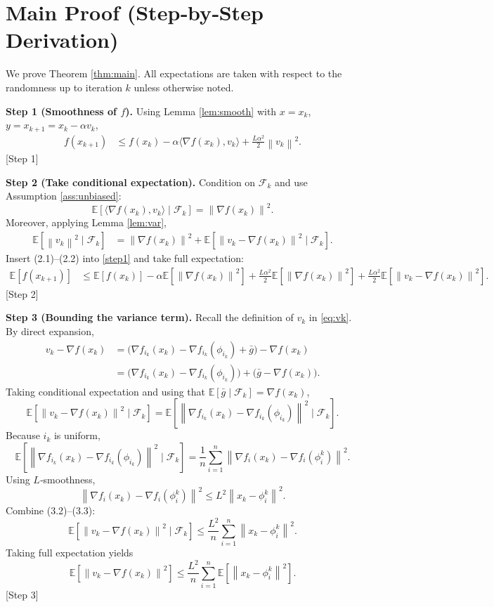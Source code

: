 \documentclass{article}
\newcommand{\E}{\mathbb{E}}
\newcommand{\norm}[1]{\left\|#1\right\|}
\newcommand{\grad}{\nabla}
\begin{document}
\section*{Main Proof (Step‑by‑Step Derivation)}
We prove Theorem \ref{thm:main}. All expectations are taken with respect to the randomness up to iteration $k$ unless otherwise noted.

\bigskip
\noindent\textbf{Step 1 (Smoothness of $f$).}  
Using Lemma \ref{lem:smooth} with $x=x_k$, $y=x_{k+1}=x_k-\alpha v_k$,
\begin{align}
f(x_{k+1}) &\le f(x_k)-\alpha\langle\grad f(x_k),v_k\rangle
             +\frac{L\alpha^{2}}{2}\norm{v_k}^{2}. \label{step1}
\end{align}
[Step 1]

\bigskip
\noindent\textbf{Step 2 (Take conditional expectation).}  
Condition on $\mathcal{F}_k$ and use Assumption \ref{ass:unbiased}:
\[
\E\!\left[\langle\grad f(x_k),v_k\rangle\mid\mathcal{F}_k\right]
   =\norm{\grad f(x_k)}^{2}. \tag{2.1}
\]
Moreover, applying Lemma \ref{lem:var},
\begin{align}
\E\!\left[\norm{v_k}^{2}\mid\mathcal{F}_k\right]
   &=\norm{\grad f(x_k)}^{2}
     +\E\!\left[\norm{v_k-\grad f(x_k)}^{2}\mid\mathcal{F}_k\right]. \tag{2.2}
\end{align}
Insert (2.1)–(2.2) into \eqref{step1} and take full expectation:
\begin{align}
\E\!\left[f(x_{k+1})\right]
 &\le \E\!\left[f(x_k)\right]
    -\alpha\E\!\left[\norm{\grad f(x_k)}^{2}\right]
    +\frac{L\alpha^{2}}{2}\E\!\left[\norm{\grad f(x_k)}^{2}\right]
    +\frac{L\alpha^{2}}{2}\E\!\left[\norm{v_k-\grad f(x_k)}^{2}\right]. \label{step2}
\end{align}
[Step 2]

\bigskip
\noindent\textbf{Step 3 (Bounding the variance term).}  
Recall the definition of $v_k$ in \eqref{eq:vk}. By direct expansion,
\begin{align}
v_k-\grad f(x_k)
   &=\bigl(\grad f_{i_k}(x_k)-\grad f_{i_k}(\phi_{i_k})+\bar g\bigr)-\grad f(x_k) \nonumber\\
   &=\bigl(\grad f_{i_k}(x_k)-\grad f_{i_k}(\phi_{i_k})\bigr)
     +\bigl(\bar g-\grad f(x_k)\bigr). \tag{3.1}
\end{align}
Taking conditional expectation and using that $\E[\bar g\mid\mathcal{F}_k]=\grad f(x_k)$,
\[
\E\!\left[\norm{v_k-\grad f(x_k)}^{2}\mid\mathcal{F}_k\right]
   =\E\!\left[\norm{\grad f_{i_k}(x_k)-\grad f_{i_k}(\phi_{i_k})}^{2}\mid\mathcal{F}_k\right].
\]
Because $i_k$ is uniform,
\[
\E\!\left[\norm{\grad f_{i_k}(x_k)-\grad f_{i_k}(\phi_{i_k})}^{2}\mid\mathcal{F}_k\right]
   =\frac{1}{n}\sum_{i=1}^{n}\norm{\grad f_i(x_k)-\grad f_i(\phi_i^k)}^{2}. \tag{3.2}
\]
Using $L$‑smoothness,
\[
\norm{\grad f_i(x_k)-\grad f_i(\phi_i^k)}^{2}
   \le L^{2}\norm{x_k-\phi_i^k}^{2}. \tag{3.3}
\]
Combine (3.2)–(3.3):
\[
\E\!\left[\norm{v_k-\grad f(x_k)}^{2}\mid\mathcal{F}_k\right]
   \le \frac{L^{2}}{n}\sum_{i=1}^{n}\norm{x_k-\phi_i^k}^{2}. \tag{3.4}
\]
Taking full expectation yields
\[
\E\!\left[\norm{v_k-\grad f(x_k)}^{2}\right]
   \le \frac{L^{2}}{n}\sum_{i=1}^{n}\E\!\left[\norm{x_k-\phi_i^k}^{2}\right]. \tag{3.5}
\]
[Step 3]
\end{document}
